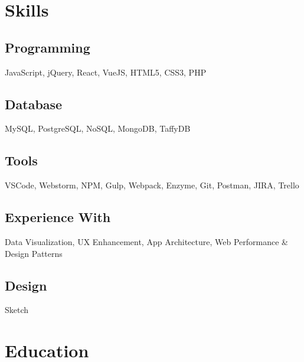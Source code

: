 \documentclass[]{gagan-resume}
\begin{document}





\begin{minipage}[t]{0.33\textwidth} 

\vspace{\topsep}
\section{Skills}
\subsection{Programming}
JavaScript, jQuery, React, VueJS, HTML5, CSS3, PHP
 \\
\subsection{Database}
MySQL, PostgreSQL, NoSQL, MongoDB, TaffyDB
 \\
\subsection{Tools}
VSCode, Webstorm, NPM, Gulp, Webpack, Enzyme, Git, Postman, JIRA, Trello
 \\
\subsection{Experience With}
Data Visualization, UX Enhancement, App Architecture, Web Performance \& Design Patterns
 \\
\subsection{Design}
Sketch
\sectionsep




\section{Education} 


\end{minipage}
\end{document}

